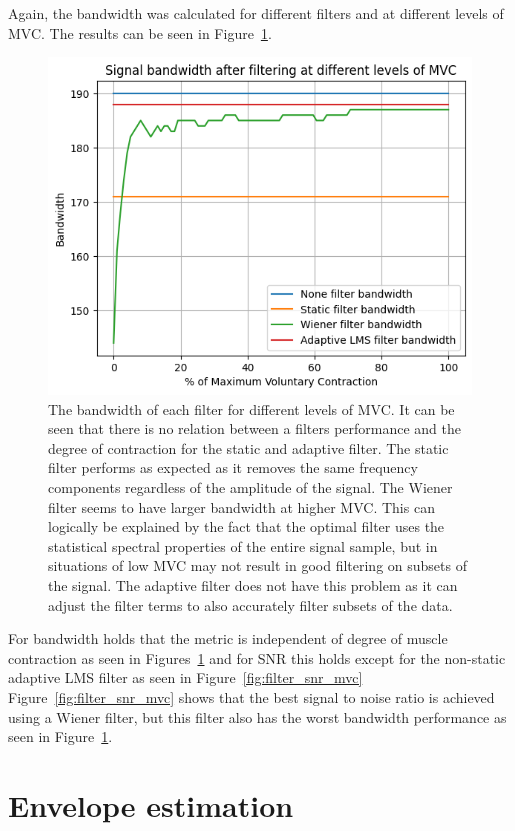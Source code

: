 Again, the bandwidth was calculated for different filters and at different levels of MVC. The results can be seen in Figure~\ref{fig:filter_bw_mvc}.

\begin{figure}[h!t]
	\begin{center}
		\includegraphics[width=0.7\columnwidth]{images/filter_bw_mvc.png}
	\end{center}
	\caption{The bandwidth of each filter for different levels of MVC. It can be seen that there is no relation between a filters performance and the degree of contraction for the static and adaptive filter. The static filter performs as expected as it removes the same frequency components regardless of the amplitude of the signal. The Wiener filter seems to have larger bandwidth at higher MVC. This can logically be explained by the fact that the optimal filter uses the statistical spectral properties of the entire signal sample, but in situations of low MVC may not result in good filtering on subsets of the signal. The adaptive filter does not have this problem as it can adjust the filter terms to also accurately filter subsets of the data. }
	\label{fig:filter_bw_mvc}
\end{figure}

For bandwidth holds that the metric is independent of degree of muscle contraction as seen in Figures~\ref{fig:filter_bw_mvc} and for SNR this holds except for the non-static adaptive LMS filter as seen in Figure~\ref{fig:filter_snr_mvc}
Figure~\ref{fig:filter_snr_mvc} shows that the best signal to noise ratio is achieved using a Wiener filter, but this filter also has the worst bandwidth performance as seen in Figure~\ref{fig:filter_bw_mvc}. 

\section{Envelope estimation}
